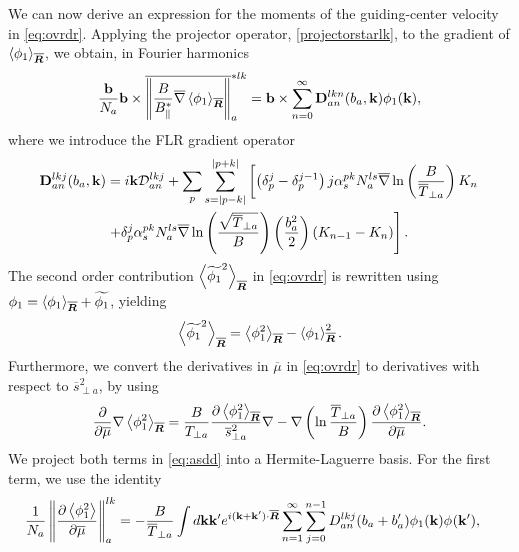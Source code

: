 We can now derive an expression for the moments of the guiding-center velocity in \cref{eq:ovrdr}.
%
Applying the projector operator, \cref{projectorstarlk}, to the gradient of ${\gyaver{\phi_1}_{\gyR}}$, we obtain, in Fourier harmonics
%
\begin{equation}  \label{momentlkgradgyaverf1}
\frac{\mathbf b}{N_a}\mathbf b \times \ovmomentstar{lk}{\frac{B}{B_{\parallel}^*}\overline \grad \gyaver{\phi_1}_{\gyR}}  = \mathbf b \times \sum_{n = 0 }^{\infty} \mathbf{{D}}^{lkn}_{an}(b_a,  \mathbf k) \phi_{1 }(\mathbf k),
\end{equation}
%
where we introduce the FLR gradient operator
%
\begin{align} \label{bmDanlkj}
\mathbf{{D}}^{lkj}_{an} (b_a, \mathbf k) & = i \mathbf k \mathcal{D}_{an}^{lkj}+\sum_p \sum_{s = |p -k|}^{|p+k|}\left[  \left( \delta_p^j- \delta_p^{j-1} \right)  j  \alpha_s^{pk}  \gyN^{ls} \gygrad \ln \left( \frac{B}{\Tperp}\right) K_{n}\right. \nonumber \\
&  \left. +   
\delta_p^j  \alpha_s^{pk}  \gyN^{ls}  \gygrad \ln \left( \frac{\sqrt{\gyTperp}}{B}\right)  \left( \frac{ b_a^2}{2} \right) \left( K_{n-1} - K_{n}\right) \right].
 \end{align}
%
The second order contribution $\left<\widetilde{\phi_1}^2\right>_{\gyR}$ in \cref{eq:ovrdr} is rewritten using $\phi_1=\left<\phi_1\right>_{\gyR}+\widetilde{\phi_1}$, yielding
%
\begin{equation}
    \left<\widetilde{\phi_1}^2\right>_{\gyR}=\left<\phi_1^2\right>_{\gyR}-\left<\phi_1\right>_{\gyR}^2.
\label{eq:widetildephi1}
\end{equation}
%
Furthermore, we convert the derivatives in $\overline \mu$ in \cref{eq:ovrdr} to derivatives with respect to $\overline s_{\perp a}^2$, by using
%
\begin{equation}
     \frac{\partial}{\partial \overline \mu} \nabla \left<\phi_1^2\right>_{\gyR} = \frac{B}{T_{\perp a}} \frac{\partial \left<\phi_1^2\right>_{\gyR}}{\overline s_{\perp a}^2}\nabla -\nabla \left( \ln \frac{\overline T_{\perp a}}{B}\right)\frac{\partial \left<\phi_1^2\right>_{\gyR}}{\partial \overline \mu}.
\label{eq:asdd}
\end{equation}
%
We project both terms in \cref{eq:asdd} into a Hermite-Laguerre basis.
%
For the first term, we use the identity
%
\begin{align} \label{momentstarlkpmugyaverphi1A1}
 \frac{1}{N_a}\moment{lk}{ \frac{\partial \gyaver{ \phi_1^2 } }{\partial \gymu}  }& =   - \frac{B}{\overline T_{\perp a}} \int d \mathbf k \mathbf k'  e^{i (\mathbf k + \mathbf k') \cdot \gyR}\sum_{n=1}^\infty \sum_{j =0}^{n-1} D_{an}^{lkj} (b_a + b_a') \phi_{1}(\mathbf k) \phi_{ }(\mathbf k'),
\end{align}
